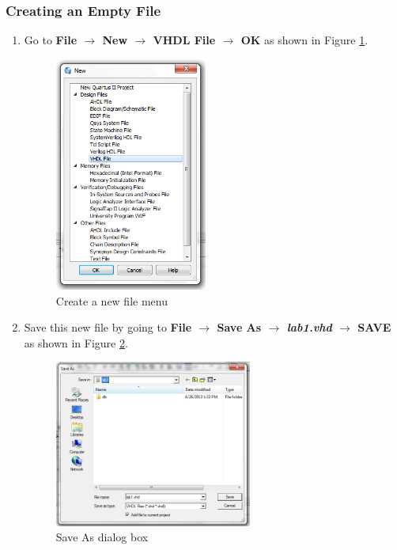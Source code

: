 \subsubsection{Creating an Empty File}
\begin{enumerate}

	\item Go to {\bf File $\rightarrow$ New $\rightarrow$ VHDL File $\rightarrow$ OK } as shown in Figure \ref{fig:newfile}.

	\begin{figure}[H]
		\centering
		\includegraphics[width=50mm]{Lab1/figures/newfile.png}
		\caption{Create a new file menu}
		\label{fig:newfile}
	\end{figure}

	\item Save this new file by going to {\bf File $\rightarrow$ Save As $\rightarrow$ \emph{lab1.vhd} $\rightarrow$ SAVE} as shown in Figure \ref{fig:saveas}.

	\begin{figure}[H]
		\centering
		\includegraphics[width=65mm]{Lab1/figures/saveas.png}
		\caption{Save As dialog box}
		\label{fig:saveas}
	\end{figure}

\end{enumerate}

